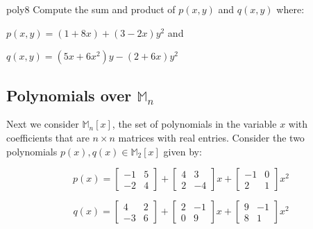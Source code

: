\begin{exercise}{poly8}
Compute the sum and product of $p(x,y)$ and $q(x,y)$ where:

$p(x,y)=  (1+8x)+(3-2x)y^2$ and

$q(x,y)= (5x+6x^2)y-(2+6x)y^2$



\end{exercise}

\subsection*{Polynomials over $\mathbb{M}_n$}
Next we consider $\mathbb{M}_n[x]$, the set of polynomials in the variable $x$ with coefficients that are  $n{\times}n$ matrices with real entries. Consider the two polynomials $p(x), q(x) \in \mathbb{M}_2[x]$ given by:

$$p(x)=  \begin{bmatrix} 
-1 & 5  \\
-2 & 4 
\end{bmatrix}
+\begin{bmatrix} 
4 & 3 \\
2 & -4 
\end{bmatrix}
 x+\begin{bmatrix} 
-1 & 0 \\
2 & 1 
\end{bmatrix}
 x^2$$

$$q(x)=  \begin{bmatrix} 
4 & 2 \\
-3 & 6
\end{bmatrix}
+\begin{bmatrix} 
2 & -1 \\
0 & 9 
\end{bmatrix}
 x+\begin{bmatrix} 
9 & -1 \\
8 & 1 
\end{bmatrix}
 x^2$$

